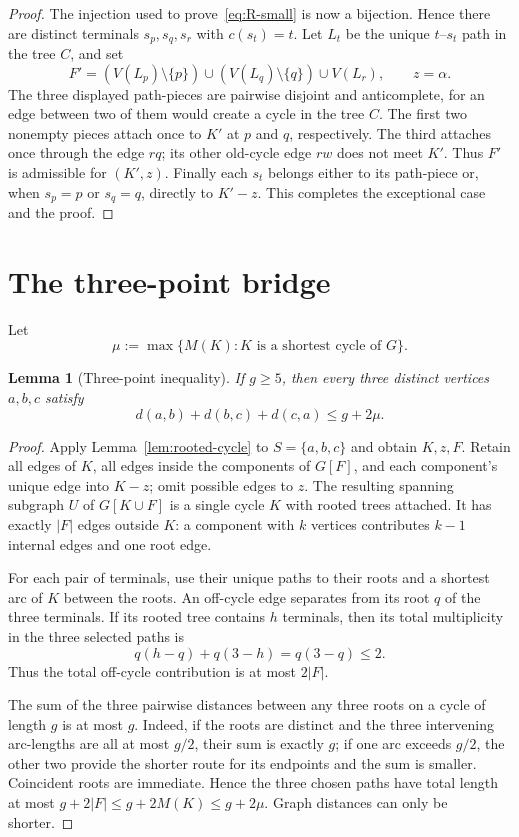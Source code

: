 \documentclass[11pt]{article}
\numberwithin{equation}{section}
\newtheorem{lemma}[theorem]{Lemma}
\theoremstyle{remark}
\begin{document}
\begin{proof}
The injection used to prove~\eqref{eq:R-small} is now a bijection.  Hence
there are distinct terminals $s_p,s_q,s_r$ with $c(s_t)=t$.  Let $L_t$ be
the unique $t$--$s_t$ path in the tree $C$, and set
\[
 F'=(V(L_p)\setminus\{p\})\cup
    (V(L_q)\setminus\{q\})\cup V(L_r),
 \qquad z=\alpha.
\]
The three displayed path-pieces are pairwise disjoint and anticomplete, for
an edge between two of them would create a cycle in the tree $C$.  The first
two nonempty pieces attach once to $K'$ at $p$ and $q$, respectively.  The
third attaches once through the edge $rq$; its other old-cycle edge $rw$
does not meet $K'$.  Thus $F'$ is admissible for $(K',z)$.  Finally each
$s_t$ belongs either to its path-piece or, when $s_p=p$ or $s_q=q$, directly
to $K'-z$.  This completes the exceptional case and the proof.
\end{proof}

\section{The three-point bridge}

Let
\[
  \mu:=\max\{M(K):K\text{ is a shortest cycle of }G\}.
\]

\begin{lemma}[Three-point inequality]\label{lem:three-point}
If $g\ge5$, then every three distinct vertices $a,b,c$ satisfy
\begin{equation}\label{eq:three-point}
 d(a,b)+d(b,c)+d(c,a)\le g+2\mu.
\end{equation}
\end{lemma}

\begin{proof}
Apply Lemma~\ref{lem:rooted-cycle} to $S=\{a,b,c\}$ and obtain $K,z,F$.
Retain all edges of $K$, all edges inside the components of $G[F]$, and each
component's unique edge into $K-z$; omit possible edges to $z$.  The resulting
spanning subgraph $U$ of $G[K\cup F]$ is a single cycle $K$ with rooted trees
attached.  It has exactly $|F|$ edges outside $K$: a component with $k$
vertices contributes $k-1$ internal edges and one root edge.

For each pair of terminals, use their unique paths to their roots and a
shortest arc of $K$ between the roots.  An off-cycle edge separates from its
root $q$ of the three terminals.  If its rooted tree contains $h$ terminals,
then its total multiplicity in the three selected paths is
\[
  q(h-q)+q(3-h)=q(3-q)\le2.
\]
Thus the total off-cycle contribution is at most $2|F|$.

The sum of the three pairwise distances between any three roots on a cycle of
length $g$ is at most $g$.  Indeed, if the roots are distinct and the three
intervening arc-lengths are all at most $g/2$, their sum is exactly $g$; if
one arc exceeds $g/2$, the other two provide the shorter route for its
endpoints and the sum is smaller.  Coincident roots are immediate.  Hence
the three chosen paths have total length at most
$g+2|F|\le g+2M(K)\le g+2\mu$.  Graph distances can only be shorter.
\end{proof}
\end{document}
